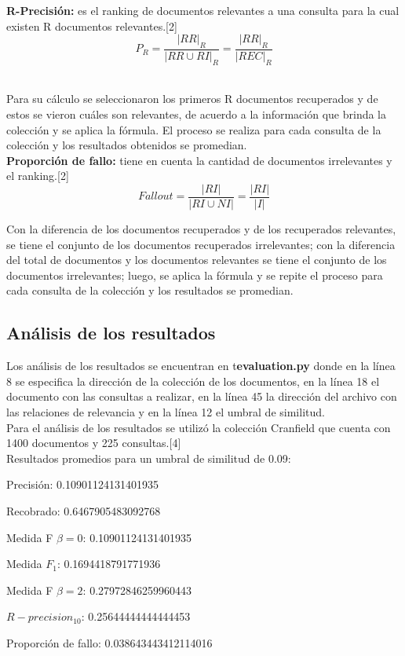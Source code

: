 \documentclass{llncs}
\begin{document}
\textbf{R-Precisi\'on:} es el ranking de documentos relevantes a una consulta para la cual existen R documentos relevantes.[2]\\

\begin{equation}
	P_R = \frac{|RR|_R}{|RR \cup RI|_R} = \frac{|RR|_R}{|REC|_R}
\end{equation}\

Para su c\'alculo se seleccionaron los primeros R documentos recuperados y de estos se vieron cu\'ales son relevantes, de acuerdo a la informaci\'on que brinda la colecci\'on y se aplica la f\'ormula. El proceso se realiza para cada consulta de la colecci\'on y los resultados obtenidos se promedian.\\

\textbf{Proporci\'on de fallo:} tiene en cuenta la cantidad de documentos irrelevantes y el ranking.[2]\\

\begin{equation}
	Fallout = \frac{|RI|}{|RI \cup NI|} = \frac{|RI|}{|I|}
\end{equation}

Con la diferencia de los documentos recuperados y de los recuperados relevantes, se tiene el conjunto de los documentos recuperados irrelevantes; con la diferencia del total de documentos y los documentos relevantes se tiene el conjunto de los documentos irrelevantes; luego, se aplica la f\'ormula y se repite el proceso para cada consulta de la colecci\'on y los resultados se promedian.\\

\subsection{An\'alisis de los resultados}

Los an\'alisis de los resultados se encuentran en t\textbf{evaluation.py} donde en la l\'inea 8 se especifica la direcci\'on de la colecci\'on de los documentos, en la l\'inea 18 el documento con las consultas a realizar, en la l\'inea 45 la direcci\'on del archivo con las relaciones de relevancia y en la l\'inea 12 el umbral de similitud.\\

Para el an\'alisis de los resultados se utiliz\'o la colecci\'on Cranfield que cuenta con 1400 documentos y 225 consultas.[4]\\

Resultados promedios para un umbral de similitud de 0.09:\\
\begin{list}{-}{•}
\item Precisi\'on: 0.10901124131401935
\item Recobrado: 0.6467905483092768
\item Medida F $\beta = 0$: 0.10901124131401935
\item Medida $F_1$: 0.1694418791771936
\item Medida F $\beta = 2$: 0.27972846259960443
\item $R-precision_10$: 0.25644444444444453
\item Proporci\'on de fallo: 0.038643443412114016
\end{list}
\end{document}
